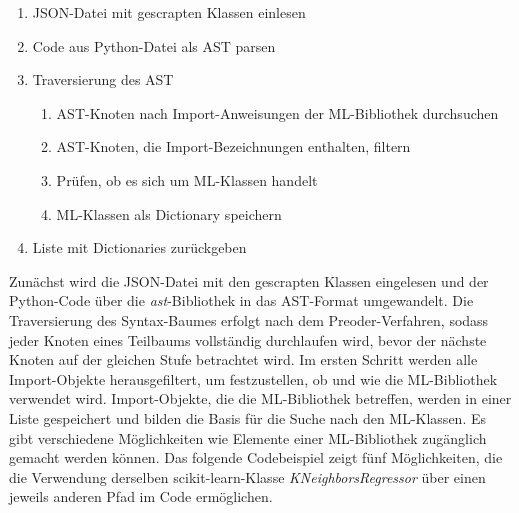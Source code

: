 \documentclass[german,bachelor]{swsLeipzig}
\begin{document}
\begin{enumerate}
 \item JSON-Datei mit gescrapten Klassen einlesen
 \item Code aus Python-Datei als AST parsen
 \item Traversierung des AST
\begin{enumerate}
    \item AST-Knoten nach Import-Anweisungen der ML-Bibliothek durchsuchen
    \item AST-Knoten, die Import-Bezeichnungen enthalten, filtern
    \item Prüfen, ob es sich um ML-Klassen handelt
    \item ML-Klassen als Dictionary speichern
    \end{enumerate}
 \item Liste mit Dictionaries zurückgeben
\end{enumerate}

\noindent Zunächst wird die JSON-Datei mit den gescrapten Klassen eingelesen und der Python-Code über die \textit{ast}-Bibliothek in das AST-Format umgewandelt.
Die Traversierung des Syntax-Baumes erfolgt nach dem Preoder-Verfahren, sodass jeder Knoten eines Teilbaums vollständig
durchlaufen wird, bevor der nächste Knoten auf der gleichen Stufe betrachtet wird.
Im ersten Schritt werden alle Import-Objekte herausgefiltert, um festzustellen, ob und wie die ML-Bibliothek verwendet wird.
Import-Objekte, die die ML-Bibliothek betreffen, werden in einer Liste gespeichert und bilden die Basis für die Suche nach
den ML-Klassen.
Es gibt verschiedene Möglichkeiten wie Elemente einer ML-Bibliothek zugänglich gemacht werden können.
Das folgende Codebeispiel zeigt fünf Möglichkeiten, die die Verwendung derselben scikit-learn-Klasse \textit{KNeighborsRegressor}
über einen jeweils anderen Pfad im Code ermöglichen. \\
\end{document}
